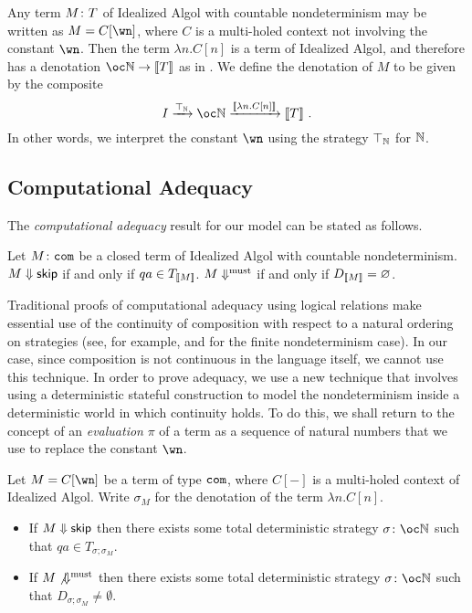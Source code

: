 \documentclass[sigplan,9pt,review]{acmart}\settopmatter{printfolios=true,printccs=false,printacmref=false}
\begin{document}
Any term $M\colon T$ of Idealized Algol with countable nondeterminism may be written as $M = C[\wn]$, where $C$ is a multi-holed context not involving the constant $\wn$.  
Then the term $\lambda n.C[n]$ is a term of Idealized Algol, and therefore has a denotation $\oc\bN \to \deno{T}$ as in \cite{SamsonGuyIAPassive}.
We define the denotation of $M$ to be given by the composite
\[
  I \xrightarrow{\top_{\bN}}
  \oc \bN \xrightarrow{\deno{\lambda n.C[n]}}
  \deno{T}\,.
  \]
In other words, we interpret the constant $\wn$ using the strategy $\top_{\mathbb{N}}$ for $\mathbb{N}$.

\subsection{Computational Adequacy}

The \emph{computational adequacy} result for our model can be stated as follows.

\begin{proposition}
  Let $M\colon{\mathtt{com}}$ be a closed term of Idealized Algol with countable nondeterminism.
  $M\Downarrow{\mathsf{skip}}$ if and only if $qa\in T_{\left\llbracket M\right\rrbracket}$.  
  $M\Downarrow^{\text{must}}$ if and only if $D_{\left\llbracket M\right\rrbracket}=\varnothing$.
  \label{prop:adequacy}
\end{proposition}

Traditional proofs of computational adequacy using logical relations make essential use of the continuity of composition with respect to a natural ordering on strategies (see, for example, \cite{mcCHFiniteND} and \cite{RusssThesis} for the finite nondeterminism case).  
In our case, since composition is not continuous in the language itself, we cannot use this technique.
In order to prove adequacy, we use a new technique that involves using a deterministic stateful construction to model the nondeterminism inside a deterministic world in which continuity holds.  
To do this, we shall return to the concept of an \emph{evaluation} $\pi$ of a term as a sequence of natural numbers that we use to replace the constant $\wn$.  

\begin{lemma}
  Let $M=C[\wn]$ be a term of type ${\mathtt{com}}$, where $C[-]$ is a multi-holed context of Idealized Algol.
  Write $\sigma_M$ for the denotation of the term $\lambda n.C[n]$.  
  \begin{itemize}
    \item If $M\Downarrow{\mathsf{skip}}$ then there exists some total deterministic strategy $\sigma\from\oc\bN$ such that $qa\in T_{\sigma;\sigma_M}$.
    \item If $M\not{\Downarrow^{\text{must}}}$ then there exists some total deterministic strategy $\sigma\from\oc\bN$ such that $D_{\sigma;\sigma_M}\ne\emptyset$.
  \end{itemize}
  \label{lem:soundness-lemma}
\end{lemma}
\end{document}
